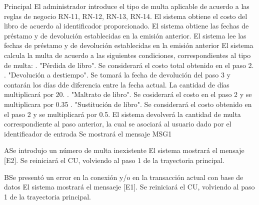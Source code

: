 \begin{UCtrayectoria}{Principal}
	\UCpaso[\UCactor] El administrador introduce el tipo de multa aplicable de acuerdo a las reglas de negocio RN-11, RN-12, RN-13, RN-14. 
	\UCpaso[\UCsist] El sistema obtiene el costo del libro de acuerdo al identificador proporcionado. 
	\UCpaso[\UCsist] El sistema obtiene las fechas de préstamo y de devolución establecidas en la emisión anterior. 
	\UCpaso[\UCsist] El sistema lee las fechas de préstamo y de devolución establecidas en la emisión anterior 
	\UCpaso[\UCsist] El sistema calcula la multa de acuerdo a las siguientes condiciones, correspondientes al tipo de multa: . "Pérdida de libro". Se considerará el costo total obtenido en el paso 2. . "Devolución a destiempo". Se tomará la fecha de devolución del paso 3 y contarán los días dde diferencia entre la fecha actual. La cantidad de días multiplicará por 20. . "Maltrato de libro". Se cosiderará el costo en el paso 2 y se multiplicara por 0.35 . "Sustitución de libro". Se considerará el costo obtenido en el paso 2 y se multiplicará por 0.5.
	\UCpaso[\UCsist] El sistema devolverá la cantidad de multa correspondiente al paso anterior, la cual se asociará al usuario dado por el identificador de entrada  
	\UCpaso[\UCsist] Se mostrará el mensaje MSG1
\end{UCtrayectoria}
\begin{UCtrayectoriaA}{A}{Se introdujo un número de multa inexistente}	
			\UCpaso[\UCsist] El sistema mostrará el mensaje [E2].
			\UCpaso[\UCsist] Se reiniciará el CU, volviendo al paso 1 de la trayectoria principal. 
\end{UCtrayectoriaA}
\begin{UCtrayectoriaA}{B}{Se presentó un error en la conexión y/o en la transacción actual con base de datos}
			\UCpaso[\UCsist] El sistema mostrará el mensaeje [E1].
			\UCpaso[\UCsist] Se reiniciará el CU, volviendo al paso 1 de la trayectoria principal.
\end{UCtrayectoriaA}
